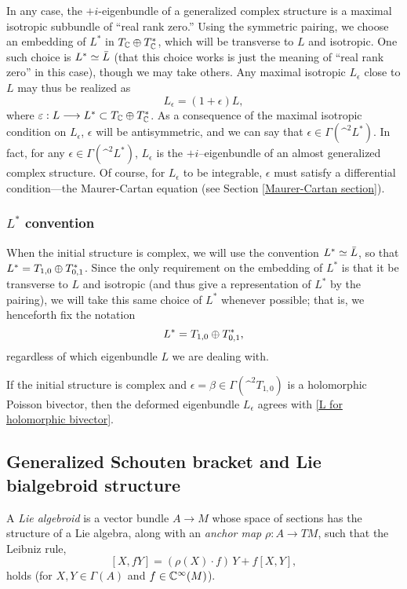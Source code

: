 \documentclass{article}
\begin{document}
In any case, the $+i$-eigenbundle of a generalized complex structure is a maximal isotropic subbundle of ``real rank zero.''  Using the symmetric pairing, we choose an embedding of $L^*$ in $T_\mathbb C \oplus T_\mathbb C^*$, which will be transverse to $L$ and isotropic.  One such choice is $L^* \simeq \bar{L}$ (that this choice works is just the meaning of ``real rank zero'' in this case), though we may take others.  Any maximal isotropic $L_\epsilon$ close to $L$ may thus be realized as
\begin{equation}\label{define deformation}
L_\epsilon = (1 + \epsilon)L,
\end{equation}
where $\varepsilon : L \longrightarrow L^* \subset T_\mathbb C \oplus T^*_\mathbb C$.  As a consequence of the maximal isotropic condition on $L_\epsilon$, $\epsilon$ will be antisymmetric, and we can say that $\epsilon \in \Gamma(\^ ^2 L^*)$.  In fact, for any $\epsilon \in \Gamma(\^ ^2 L^*)$, $L_\epsilon$ is the $+i$--eigenbundle of an almost generalized complex structure.  Of course, for $L_\epsilon$ to be integrable, $\epsilon$ must satisfy a differential condition---the Maurer-Cartan equation (see Section \ref{Maurer-Cartan section}).

\subsubsection{$L^*$ convention}\label{L* convention}
When the initial structure is complex, we will use the convention $L^* \simeq \bar{L}$, so that $L^* = T_{1,0} \oplus T^*_{0,1}$.  Since the only requirement on the embedding of $L^*$ is that it be transverse to $L$ and isotropic (and thus give a representation of $L^*$ by the pairing), we will take this same choice of $L^*$ whenever possible; that is, we henceforth fix the notation
\begin{equation}
L^* = T_{1,0} \oplus T^*_{0,1},
\end{equation}
regardless of which eigenbundle $L$ we are dealing with.


\begin{rem}
If the initial structure is complex and $\epsilon = \beta \in \Gamma(\^ ^2 T_{1,0})$ is a holomorphic Poisson bivector, then the deformed eigenbundle $L_\epsilon$ agrees with \eqref{L for holomorphic bivector}.
\end{rem}


\subsection{Generalized Schouten bracket and Lie bialgebroid structure}
A \emph{Lie algebroid} is a vector bundle $A \to M$ whose space of sections has the structure of a Lie algebra, along with an \emph{anchor map} ${\rho : A \to TM}$, such that the Leibniz rule,
$$[X,fY] = \left(\rho(X)\cdot f\right)\, Y + f[X,Y],$$
holds (for $X,Y \in \Gamma(A)$ and $f \in \mathbb C^\infty(M)$).
\end{document}
